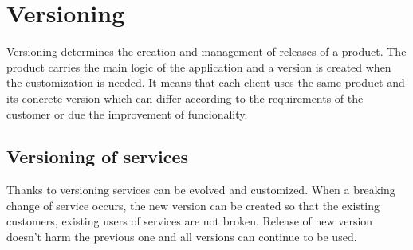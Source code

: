 \chapter{Versioning}
\label{chap:versioning}

Versioning determines the creation and management of releases of a product. The product carries the main logic of the application and a version is created when the customization is needed. It means that each client uses the same product and its concrete version which can differ according to the requirements of the customer or due the improvement of funcionality. 

\section{Versioning of services}
Thanks to versioning services can be evolved and customized. When a breaking change of service occurs, the new version can be created so that the existing customers, existing users of services are not broken. Release of new version doesn't harm the previous one and all versions can continue to be used.




